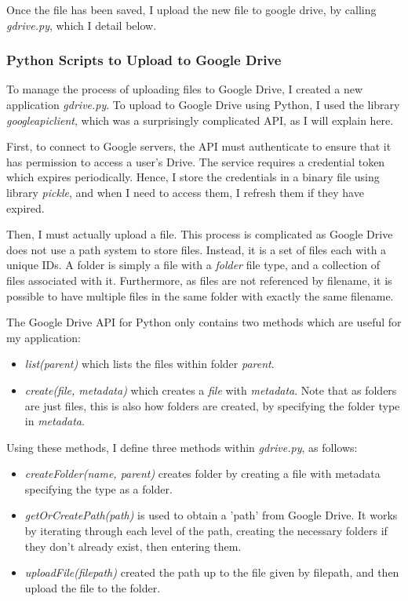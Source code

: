 \documentclass[12pt,a4paper,twoside,openright]{report}
\begin{document}
Once the file has been saved, I upload the new file to google drive, by
calling \emph{gdrive.py}, which I detail below.

\subsubsection{Python Scripts to Upload to Google Drive}

To manage the process of uploading files to Google Drive, I created a new
application \emph{gdrive.py}. To upload to Google Drive using Python, I used
the library \emph{googleapiclient}, which was a surprisingly complicated API,
as I will explain here.

First, to connect to Google servers, the API must authenticate to ensure that
it has permission to access a user's Drive. The service requires a credential
token which expires periodically. Hence, I store the credentials in a binary
file using library \emph{pickle}, and when I need to access them, I 
refresh them if they have expired.

Then, I must actually upload a file. This process is complicated as Google
Drive does not use a path system to store files. Instead, it is a set of files
each with a unique IDs. A folder is simply a file with a \emph{folder} file
type, and a collection of files associated with it. Furthermore, as files are
not referenced by filename, it is possible to have multiple files in the same
folder with exactly the same filename.

The Google Drive API for Python only contains two methods which are useful for
my application:

\begin{itemize}
	\item \emph{list(parent)} which lists the files within folder
		\emph{parent}.

	\item \emph{create(file, metadata)} which creates a \emph{file} with
		\emph{metadata}. Note that as folders
		are just files, this is also how folders are created, by
		specifying the folder type in \emph{metadata}.
\end{itemize}

Using these methods, I define three methods within \emph{gdrive.py}, as follows:

\begin{itemize}
	\item \emph{createFolder(name, parent)} creates folder by creating a
		file with metadata specifying the type as a folder.

	\item \emph{getOrCreatePath(path)} is used to obtain a 'path' from Google
		Drive. It works by iterating through each level of the path,
		creating the necessary folders if they don't already exist,
		then entering them.

	\item \emph{uploadFile(filepath)} created the path up to the file
		given by filepath, and then upload the file to the folder.
\end{itemize}
\end{document}
